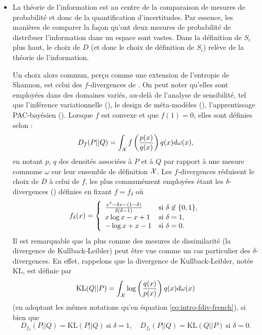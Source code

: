 \begin{itemize}
    \item La théorie de l'information est au centre de la comparaison de mesures de probabilité et donc de la quantification d'incertitudes. Par essence, les manières de comparer la façon qu'ont deux mesures de probabilité de  distribuer l'information dans un espace sont vastes. 
    Dans la définition de $S_i$ plus haut, le choix de $D$ (et donc le choix de définition de $S_i$) relève de la théorie de l'information.
    
    
    Un choix alors commun, perçu comme une extension de l'entropie de Shannon, est celui des $f$-diverg\-ences de \citet{csiszar_information-type_1967}. On peut noter qu'elles sont employées dans des domaines variés, au-delà de l'analyse de sensibilité, tel que l'inférence variationnelle (\cite{minka_divergence_2005,bach_sum--squares_2023}), le design de méta-modèles (\cite{nguyen_surrogate_2009}), l'apprentissage PAC-bayésien (\cite{picard-weibel_change_2022}).
    Lorsque $f$ est convexe et que $f(1)=0$, elles sont définies selon :
        \begin{equation}\label{eq:intro-fdiv-french}
            D_f(P||Q) = \int_{\mathcal{X}} f\left( \frac{p(x)}{q(x)} \right) q(x)d\omega(x),
        \end{equation}
    en notant $p$, $q$ des densités associées à $P$ et à $Q$ par rapport à une mesure commune $\omega$ sur leur ensemble de définition $\mathcal{X}$.     
    Les $f$-divergences réduisent le choix de $D$ à celui de $f$, les plus communément employées étant les $\delta$-divergences (\cite{zhu_information_1995}) définies en fixant $f=f_\delta$ où
        \begin{equation}
            f_\delta(x) = \left\lbrace\begin{array}{l l} \frac{x^\delta-\delta x-(1-\delta)}{\delta(\delta-1)} & \text{si\ }\delta\not\in\{0,1\},\\ 
                x\log x-x+1  & \text{si\ }\delta=1, \\
                -\log x +x -1 & \text{si\ }\delta=0.
            \end{array}\right. 
        \end{equation}    
    Il est remarquable que la  plus connue des mesures de dissimilarité (la divergence de Kullback-Leibler) peut être vue comme un cas particulier des $\delta$-divergences. En effet, rappelons que la divergence de Kullback-Leibler, notée $\text{KL}$, est définie par 
        \begin{equation}
            \text{KL}(Q||P) = \int_{\mathcal{X}}\log\left(\frac{q(x)}{p(x)}\right)q(x)d\omega(x)
        \end{equation}
        (en adoptant les mêmes notations qu'en équation \eqref{eq:intro-fdiv-french}), si bien que 
        \begin{equation}
            D_{f_\delta}(P||Q) = \text{KL}(P||Q)\ \text{si\ }\delta=1,\quad D_{f_\delta}(P||Q) = \text{KL}(Q||P)\ \text{si\ }\delta=0.
        \end{equation}


\end{itemize}
